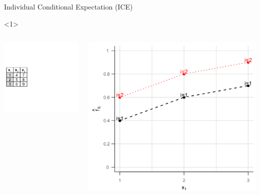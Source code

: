 \begin{vbframe}{Individual Conditional Expectation (ICE)}
\framebreak
\begin{onlyenv}<1>
  \vspace{1cm}
    \begin{columns}[T]
\begin{column}{0.5\textwidth}
\centering
\includegraphics[page=6, width=\textwidth]{figure_man/ice_pd_plot_demo}
  \end{column}
 \begin{column}{0.5\textwidth}
\vspace{0.3cm}

\begin{center}
\includegraphics[width=1\textwidth]{figure_man/ICE03.png}
\end{center}


\end{column}
\end{columns}
\end{onlyenv}
\end{vbframe}
